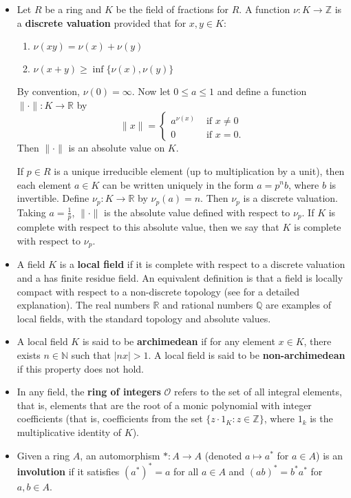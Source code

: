 \begin{itemize}
\item Let $R$ be a ring and $K$ be the field of fractions for $R$.
A function $\nu: K \to \mathbb{Z}$ is a \textbf{discrete valuation} provided that for $x, y \in K$:
\begin{enumerate}
\item $\nu(xy) = \nu(x) + \nu(y)$
\item $\nu(x + y) \ge \inf\{\nu(x), \nu(y)\}$
\end{enumerate}
By convention, $\nu(0) = \infty$.
Now let $0 \le a \le 1$ and define a function $\|\cdot \|: K \to \mathbb{R}$ by
\[
\|x\| = \begin{cases}
a^{\nu(x)} &\text{ if } x \ne 0\\
0 &\text{ if } x = 0.
\end{cases}
\]
Then $\| \cdot \|$ is an absolute value on $K$.

If $p \in R$ is a unique irreducible element (up to multiplication by a unit), then each element $a \in K$ 
can be written uniquely in the form $a = p^n b$, where $b$ is invertible.
Define $\nu_p: K \to \mathbb{R}$ by $\nu_p(a) = n$.
Then $\nu_p$ is a discrete valuation.
Taking $a = \frac{1}{p}$, $\| \cdot \|$ is the absolute value defined with respect to $\nu_p$.
If $K$ is complete with respect to this absolute value, then we say that $K$ is complete with respect to $\nu_p$.

\item A field $K$ is a \textbf{local field} if it is complete with respect to a discrete valuation and a has finite residue field.
An equivalent definition is that a field is locally compact with respect to a non-discrete topology (see \cite{serre} for a detailed explanation).
The real numbers $\mathbb{R}$ and rational numbers $\mathbb{Q}$ are examples of local fields, with the standard topology and absolute values.

\item A local field $K$ is said to be \textbf{archimedean} if for any element $x \in K$, there exists $n \in \mathbb{N}$ such that $|nx| > 1$.
A local field is said to be \textbf{non-archimedean} if this property does not hold.

\item In any field, the \textbf{ring of integers} $\mathcal{O}$ refers to the set of all integral elements, that is, 
elements that are the root of a monic polynomial with integer coefficients 
(that is, coefficients from the set $\{z \cdot 1_K : z \in \mathbb{Z} \}$, where $1_k$ is the multiplicative identity of $K$).

\item Given a ring $A$, an automorphism $*: A \to A$ (denoted $a \mapsto a^*$ for $a \in A$) is an \textbf{involution} 
if it satisfies $(a^*)^* = a$ for all $a \in A$ and $(ab)^* = b^* a^*$ for $a, b \in A$.
\end{itemize}

